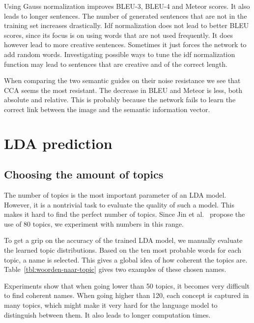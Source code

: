 \documentclass[twoside,twocolumn]{article}
\begin{document}
Using Gauss normalization improves BLEU-3,  BLEU-4 and Meteor scores. It also leads to longer sentences. The number of generated sentences that are not in the training set increases drastically. Idf normalization does not lead to better BLEU scores, since its focus is on using words that are not used frequently. It does however lead to more creative sentences. Sometimes it just forces the network to add random words. Investigating possible ways to tune the idf normalization function may lead to sentences that are creative and of the correct length.

When comparing the two semantic guides on their noise resistance we see that CCA seems the most resistant. The decrease in BLEU and Meteor is less, both absolute and relative. This is probably because the network fails to learn the correct link between the image and the semantic information vector.







\clearpage
\appendix
\section{LDA prediction}
\label{appendix:LDA}
\subsection{Choosing the amount of topics}
The number of topics is the most important parameter of an LDA model. However, it is a nontrivial task to evaluate the quality of such a model. This makes it hard to find the perfect number of topics. Since Jin et al.~\cite{Jin2015} propose the use of 80 topics, we experiment with numbers in this range.

To get a grip on the accuracy of the trained LDA model, we manually evaluate the learned topic distributions. Based on the ten most probable words for each topic, a name is selected. This gives a global idea of how coherent the topics are. Table~\ref{tbl:woorden-naar-topic} gives two examples of these chosen names.

Experiments show that when going lower than 50 topics, it becomes very difficult to find coherent names. When going higher than 120, each concept is captured in many topics, which might make it very hard for the language model to distinguish between them. It also leads to longer computation times. 
\end{document}
